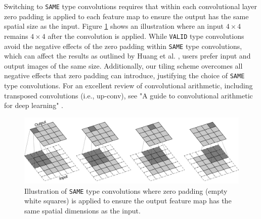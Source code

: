 \documentclass[letterpaper]{article} %
\begin{document}
Switching to \texttt{SAME} type convolutions requires that within each convolutional layer zero padding is applied to each feature map to ensure the output has the same spatial size as the input. Figure \ref{fig:same} shows an illustration where an input $4 \times 4$ remains $4 \times 4$ after the convolution is applied. 
While \texttt{VALID} type convolutions avoid the negative effects of the zero padding within \texttt{SAME} type convolutions, which can affect the results as outlined by Huang et al. \cite{Huang2019a}, users prefer input and output images of the same size. Additionally, our tiling scheme overcomes all negative effects that zero padding can introduce, justifying the choice of \texttt{SAME} type convolutions. 
For an excellent review of convolutional arithmetic, including transposed convolutions (i.e., up-conv), see "A guide to convolutional arithmetic for deep learning" \cite{Dumoulin2018}.

\begin{figure}[h]
	\centering
		\includegraphics[width=\linewidth]{figs/same_padding.png}
		\caption{Illustration of \texttt{SAME} type convolutions where zero padding (empty white squares) is applied to ensure the output feature map has the same spatial dimensions as the input.}
	\label{fig:same}
\end{figure}
\end{document}
